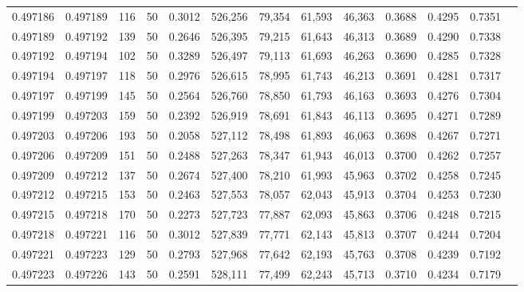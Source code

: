 \begin{tabular}{rrrrrrrrrrrrr}
0.497186 & 0.497189 &   116 &  50 &                                     0.3012 & 526,256 &  79,354 &  61,593 &  46,363 & 0.3688 & 0.4295 & 0.7351 \\
0.497189 & 0.497192 &   139 &  50 &                                     0.2646 & 526,395 &  79,215 &  61,643 &  46,313 & 0.3689 & 0.4290 & 0.7338 \\
0.497192 & 0.497194 &   102 &  50 &                                     0.3289 & 526,497 &  79,113 &  61,693 &  46,263 & 0.3690 & 0.4285 & 0.7328 \\
0.497194 & 0.497197 &   118 &  50 &                                     0.2976 & 526,615 &  78,995 &  61,743 &  46,213 & 0.3691 & 0.4281 & 0.7317 \\
0.497197 & 0.497199 &   145 &  50 &                                     0.2564 & 526,760 &  78,850 &  61,793 &  46,163 & 0.3693 & 0.4276 & 0.7304 \\
0.497199 & 0.497203 &   159 &  50 &                                     0.2392 & 526,919 &  78,691 &  61,843 &  46,113 & 0.3695 & 0.4271 & 0.7289 \\
0.497203 & 0.497206 &   193 &  50 &                                     0.2058 & 527,112 &  78,498 &  61,893 &  46,063 & 0.3698 & 0.4267 & 0.7271 \\
0.497206 & 0.497209 &   151 &  50 &                                     0.2488 & 527,263 &  78,347 &  61,943 &  46,013 & 0.3700 & 0.4262 & 0.7257 \\
0.497209 & 0.497212 &   137 &  50 &                                     0.2674 & 527,400 &  78,210 &  61,993 &  45,963 & 0.3702 & 0.4258 & 0.7245 \\
0.497212 & 0.497215 &   153 &  50 &                                     0.2463 & 527,553 &  78,057 &  62,043 &  45,913 & 0.3704 & 0.4253 & 0.7230 \\
0.497215 & 0.497218 &   170 &  50 &                                     0.2273 & 527,723 &  77,887 &  62,093 &  45,863 & 0.3706 & 0.4248 & 0.7215 \\
0.497218 & 0.497221 &   116 &  50 &                                     0.3012 & 527,839 &  77,771 &  62,143 &  45,813 & 0.3707 & 0.4244 & 0.7204 \\
0.497221 & 0.497223 &   129 &  50 &                                     0.2793 & 527,968 &  77,642 &  62,193 &  45,763 & 0.3708 & 0.4239 & 0.7192 \\
0.497223 & 0.497226 &   143 &  50 &                                     0.2591 & 528,111 &  77,499 &  62,243 &  45,713 & 0.3710 & 0.4234 & 0.7179 \\

\end{tabular}
